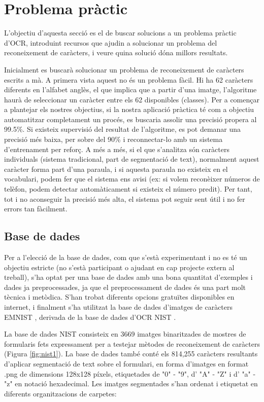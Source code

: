 \documentclass[12pt, spanish]{article}
\begin{document}
\clearpage
\section{Problema pràctic}

L'objectiu d'aquesta secció es el de buscar solucions a un problema pràctic d'OCR, introduint recursos que ajudin a solucionar un problema del reconeixement de caràcters, i veure quina solució dóna millors resultats. 

Inicialment es buscarà solucionar un problema de reconeixement de caràcters escrits a mà. A primera vista aquest no és un problema fàcil. Hi ha 62 caràcters diferents en l'alfabet anglès, el que implica que a partir d'una imatge, l'algoritme haurà de seleccionar un caràcter entre els 62 disponibles (classes). Per a començar a plantejar els nostres objectius, si la nostra aplicació pràctica té com a objectiu automatitzar completament un procés, es buscaria assolir una precisió propera al 99.5\%. Si existeix supervisió del resultat de l'algoritme, es pot demanar una precisió més baixa, per sobre del 90\% i reconnectar-lo amb un sistema d'entrenament per reforç. A més a més, si el que s'analitza són caràcters individuals (sistema tradicional, part de segmentació de text), normalment aquest caràcter forma part d'una paraula, i si aquesta paraula no existeix en el vocabulari, podem fer que el sistema ens avisi (ex: si volem reconèixer números de telèfon, podem detectar automàticament si existeix el número predit). Per tant, tot i no aconseguir la precisió més alta, el sistema pot seguir sent útil i no fer errors tan fàcilment. 

\subsection{Base de dades}

Per a l'elecció de la base de dades, com que s'està experimentant i no es té un objectiu estricte (no s'està participant o ajudant en cap projecte extern al treball), s'ha optat per una base de dades amb una bona quantitat d'exemples i dades ja preprocessades, ja que el preprocessament de dades és una part molt tècnica i metòdica. S'han trobat diferents opcions gratuïtes disponibles en internet, i finalment s'ha utilitzat la base de dades d'imatges de caràcters EMNIST \cite{EMNIST}, derivada de la base de dades d'OCR NIST \cite{watson1992nist}.

La base de dades NIST consisteix en 3669 imatges binaritzades de mostres de formularis fets expressament per a testejar mètodes de reconeixement de caràcters (Figura \ref{fig:nist1}). La base de dades també conté els 814,255 caràcters resultants d'aplicar segmentació de text sobre el formulari, en forma d'imatges en format .png de dimensions 128x128 píxels, etiquetades de "0" - "9", d' "A" - "Z" i d' "a" - "z" en notació hexadecimal. Les imatges segmentades s'han ordenat i etiquetat en diferents organitzacions de carpetes:
\end{document}
